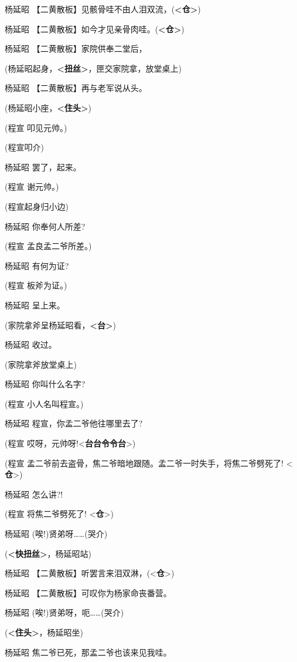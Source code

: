 杨延昭
【二黄散板】见骸骨哇不由人泪双流，(\textbf{\textless{}仓\textgreater{}})

杨延昭
【二黄散板】如今才见亲骨肉哇。(\textbf{\textless{}仓\textgreater{}})

杨延昭 【二黄散板】家院供奉二堂后，

(杨延昭起身，\textbf{\textless{}扭丝\textgreater{}}，匣交家院拿，放堂桌上)

杨延昭 【二黄散板】再与老军说从头。

(杨延昭小座，\textbf{\textless{}住头\textgreater{}})

(程宣 叩见元帅。)

(程宣叩介)

杨延昭 罢了，起来。

(程宣 谢元帅。)

(程宣起身归小边)

杨延昭 你奉何人所差?

(程宣 孟良孟二爷所差。)

杨延昭 有何为证?

(程宣 板斧为证。)

杨延昭 呈上来。

(家院拿斧呈杨延昭看，\textbf{\textless{}台\textgreater{}})

杨延昭 收过。

(家院拿斧放堂桌上)

杨延昭 你叫什么名字?

(程宣 小人名叫程宣。)

杨延昭 程宣，你孟二爷他往哪里去了?

(程宣 哎呀，元帅呀!\textless{}\textbf{台台令令台}\textgreater{})

(程宣 孟二爷前去盗骨，焦二爷暗地跟随。孟二爷一时失手，将焦二爷劈死了!
\textless{}\textbf{仓}\textgreater{})

杨延昭 怎么讲?!

(程宣 将焦二爷劈死了! \textless{}\textbf{仓}\textgreater{})

杨延昭 (唉!)贤弟呀\ldots{}\ldots{}(哭介)

(\textbf{\textless{}快扭丝\textgreater{}}，杨延昭站)

杨延昭
【二黄散板】听罢言来泪双淋，(\textless{}\textbf{仓}\textgreater{})

杨延昭 【二黄散板】可叹你为杨家命丧番营。

杨延昭 (唉!)贤弟呀，呃\ldots{}\ldots{}(哭介)

(\textbf{\textless{}住头\textgreater{}}，杨延昭坐)

杨延昭 焦二爷已死，那孟二爷也该来见我哇。

